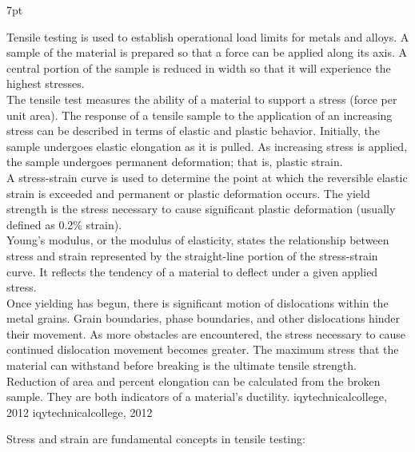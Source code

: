 \documentclass{article}
\newcommand{\formalsource}{} %
\newenvironment{formal}[1][]{%
    \renewcommand{\formalsource}{#1}%
    \def\FrameCommand{%
        \hspace{1pt}%
        {\color{darkblue}\vrule width 2pt}%
        {\color{formalshade}\vrule width 4pt}%
        \colorbox{formalshade}%
    }%
    \MakeFramed{\advance\hsize-\width\FrameRestore}%
    \noindent\hspace{-4.55pt}%
    \begin{adjustwidth}{}{7pt}%
        \vspace{2pt}%
    }%
    {%
        \vspace{4pt}%
        \ifx\formalsource\empty %
        \else
        \hfill{\footnotesize{\formalsource}}%
        \fi
    \end{adjustwidth}\endMakeFramed%
}
\begin{document}
    \begin{formal}[iqytechnicalcollege, 2012]
        Tensile testing is used to establish operational load limits for metals and alloys. A sample of the material is prepared so that a force can be applied along its axis. A central portion of the sample is reduced in width so that it will experience the highest stresses.\\[8pt]
        The tensile test measures the ability of a material to support a stress (force per unit area). The response of a tensile sample to the application of an increasing stress can be described in terms of elastic and plastic behavior. Initially, the sample undergoes elastic elongation as it is pulled. As increasing stress is applied, the sample undergoes permanent deformation; that is, plastic strain.\\[8pt]
        A stress-strain curve is used to determine the point at which the reversible elastic strain is exceeded and permanent or plastic deformation occurs. The yield strength is the stress necessary to cause significant plastic deformation (usually defined as 0.2\% strain).\\[8pt]
        Young’s modulus, or the modulus of elasticity, states the relationship between stress and strain represented by the straight-line portion of the stress-strain curve. It reflects the tendency of a material to deflect under a given applied stress.\\[8pt]
        Once yielding has begun, there is significant motion of dislocations within the metal grains. Grain boundaries, phase boundaries, and other dislocations hinder their movement. As more obstacles are encountered, the stress necessary to cause continued dislocation movement becomes greater. The maximum stress that the material can withstand before breaking is the ultimate tensile strength.\\[8pt]
        Reduction of area and percent elongation can be calculated from the broken sample. They are both indicators of a material’s ductility.
        \end{formal}

     Stress and strain are fundamental concepts in tensile testing:\\[8pt]
\end{document}
